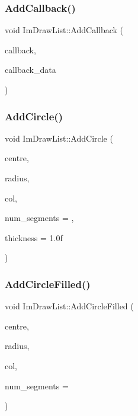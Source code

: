 \hypertarget{struct_im_draw_list_a14073d60ef9db9dc663dc7717a4893a5}{}\label{struct_im_draw_list_a14073d60ef9db9dc663dc7717a4893a5} 
\subsubsection{\texorpdfstring{Add\+Callback()}{AddCallback()}}
{\footnotesize\ttfamily void Im\+Draw\+List\+::\+Add\+Callback (\begin{DoxyParamCaption}\item[{Im\+Draw\+Callback}]{callback,  }\item[{void $\ast$}]{callback\+\_\+data }\end{DoxyParamCaption})}

\hypertarget{struct_im_draw_list_a26c34a87eca6aefa02ca4e4951dcd170}{}\label{struct_im_draw_list_a26c34a87eca6aefa02ca4e4951dcd170} 
\subsubsection{\texorpdfstring{Add\+Circle()}{AddCircle()}}
{\footnotesize\ttfamily void Im\+Draw\+List\+::\+Add\+Circle (\begin{DoxyParamCaption}\item[{const \hyperlink{struct_im_vec2}{Im\+Vec2} \&}]{centre,  }\item[{float}]{radius,  }\item[{Im\+U32}]{col,  }\item[{int}]{num\+\_\+segments = {},  }\item[{float}]{thickness = {\ttfamily 1.0f} }\end{DoxyParamCaption})}

\hypertarget{struct_im_draw_list_a293e87d22e17587e3994cf6deb20be45}{}\label{struct_im_draw_list_a293e87d22e17587e3994cf6deb20be45} 
\subsubsection{\texorpdfstring{Add\+Circle\+Filled()}{AddCircleFilled()}}
{\footnotesize\ttfamily void Im\+Draw\+List\+::\+Add\+Circle\+Filled (\begin{DoxyParamCaption}\item[{const \hyperlink{struct_im_vec2}{Im\+Vec2} \&}]{centre,  }\item[{float}]{radius,  }\item[{Im\+U32}]{col,  }\item[{int}]{num\+\_\+segments = {} }\end{DoxyParamCaption})}

